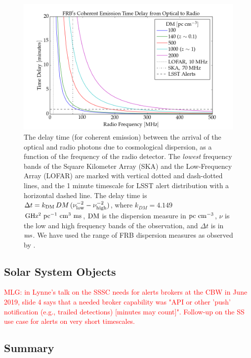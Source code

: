 \documentclass[DM,lsstdraft,authoryear,toc]{lsstdoc}
\begin{document}
\begin{figure}[h]
\begin{center}
\includegraphics[width=12cm]{figures/frb_optical_delays.png}
\caption{The delay time (for coherent emission) between the arrival of the optical and radio photons due to cosmological dispersion, as a function of the frequency of the radio detector. The {\it lowest} frequency bands of the Square Kilometer Array (SKA) and the Low-Frequency Array (LOFAR) are marked with vertical dotted and dash-dotted lines, and the 1 minute timescale for LSST alert distribution with a horizontal dashed line. The delay time is $\Delta t = k_{\rm DM}\,DM\,(\nu_{\rm low}^{-2} - \nu_{\rm high}^{-2})$, where $k_{DM}=4.149$ $\rm GHz^2\ pc^{-1}\ cm^3\ ms$, ${\rm DM}$ is the dispersion measure in $\rm pc\ cm^{-3}$, $\nu$ is the low and high frequency bands of the observation, and $\Delta t$ is in $\rm ms$. We have used the range of FRB dispersion measures as observed by \cite{2018Natur.562..386S}. \label{fig:sci_frb}}
\end{center}
\end{figure}

\subsection{Solar System Objects}\label{ssec:latency_sso}

\textcolor{red}{MLG: in Lynne's talk on the SSSC needs for alerts brokers at the CBW in June 2019, slide 4 says that a needed broker capability was "API or other 'push' notification (e.g., trailed detections) [minutes may count]". Follow-up on the SS use case for alerts on very short timescales.}


\subsection{Summary}\label{ssec:latency_summary}
\end{document}
